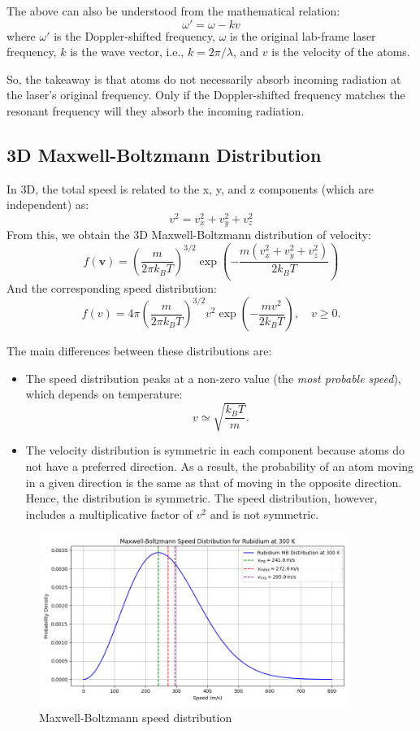 \documentclass[a4paper, 12pt]{article}
\begin{document}
The above can also be understood from the mathematical relation:
\[
    \omega' = \omega - kv
\]
where 
$\omega'$ is the Doppler-shifted frequency, $\omega$ is the original lab-frame laser frequency, $k$ is the wave vector, i.e., $k = 2\pi/\lambda$, and $v$ is the velocity of the atoms.

So, the takeaway is that atoms do not necessarily absorb incoming radiation at the laser’s original frequency. Only if the Doppler-shifted frequency matches the resonant frequency will they absorb the incoming radiation. 

\subsection{3D Maxwell-Boltzmann Distribution}
In 3D, the total speed is related to the x, y, and z components (which are independent) as:
\[
    v^2 = v_x^2 + v_y^2 + v_z^2
\]
From this, we obtain the 3D Maxwell-Boltzmann distribution of velocity:
\[
\boxed{
f(\mathbf{v}) = \left(\frac{m}{2 \pi k_B T}\right)^{3/2} \exp\left( - \frac{m (v_x^2 + v_y^2 + v_z^2)}{2 k_B T} \right)
}
\]
And the corresponding speed distribution:
\[
\boxed{
f(v) = 4 \pi \left(\frac{m}{2 \pi k_B T}\right)^{3/2} v^2 \exp\left( - \frac{m v^2}{2 k_B T} \right), \quad v \geq 0.
}
\]

The main differences between these distributions are:
\begin{itemize}
    \item The speed distribution peaks at a non-zero value (the \textit{most probable speed}), which depends on temperature:
    \[
        v \simeq \sqrt{\frac{k_B T}{m}}.
    \]
    
    \item The velocity distribution is symmetric in each component because atoms do not have a preferred direction. As a result, the probability of an atom moving in a given direction is the same as that of moving in the opposite direction. Hence, the distribution is symmetric. The speed distribution, however, includes a multiplicative factor of $v^2$ and is not symmetric.
\end{itemize}

\begin{figure}[htbp]
    \centering
    \includegraphics[width=0.9\textwidth]{mb-speed.png}
    \caption{Maxwell-Boltzmann speed distribution}
\end{figure}
\end{document}
